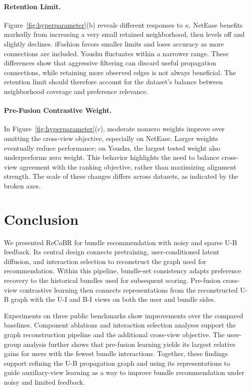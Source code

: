 \documentclass[letterpaper]{article}
\begin{document}
\paragraph{Retention Limit.}
Figure~\ref{fig:hyperparameter}(b) reveals different responses
to $\kappa$. NetEase benefits markedly from increasing a very
small retained neighborhood, then levels off and slightly
declines. iFashion favors smaller limits and loses accuracy
as more connections are included. Youshu fluctuates within a
narrower range. These differences show that aggressive
filtering can discard useful propagation connections, while
retaining more observed edges is not always beneficial.
The retention limit should therefore account for the
dataset's balance between neighborhood coverage and
preference relevance.

\paragraph{Pre-Fusion Contrastive Weight.}
In Figure~\ref{fig:hyperparameter}(c), moderate nonzero weights
improve over omitting the cross-view objective, especially
on NetEase. Larger weights eventually reduce performance;
on Youshu, the largest tested weight also underperforms
zero weight. This behavior highlights the need to balance
cross-view agreement with the ranking objective, rather than
maximizing alignment strength. The scale of these changes
differs across datasets, as indicated by the broken axes.


\section{Conclusion}

We presented ReCoBR for bundle recommendation with noisy and
sparse U-B feedback. Its central design connects pretraining,
user-conditioned latent diffusion, and interaction selection
to reconstruct the graph used for recommendation. Within this
pipeline, bundle-set consistency adapts preference recovery
to the historical bundles used for subsequent scoring.
Pre-fusion cross-view contrastive learning then connects
representations from the reconstructed U-B graph with the
U-I and B-I views on both the user and bundle sides.

Experiments on three public benchmarks show improvements over
the compared baselines. Component ablations and interaction
selection analyses support the graph reconstruction pipeline
and the additional cross-view objective. The user-group
analysis further shows that pre-fusion learning yields its
largest relative gains for users with the fewest bundle
interactions. Together, these findings support refining the
U-B propagation graph and using its representations to guide
auxiliary-view learning as a way to improve bundle
recommendation under noisy and limited feedback.


\end{document}
